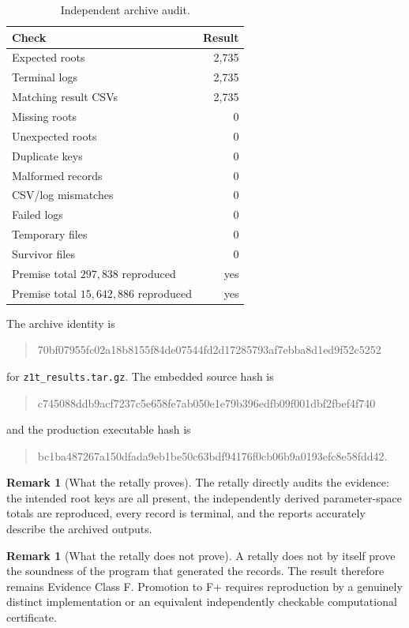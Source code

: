 \documentclass[11pt,a4paper]{article}
\theoremstyle{definition}\newtheorem{definition}[theorem]{Definition}\newtheorem{remark}[theorem]{Remark}
\newcommand{\code}[1]{\texttt{#1}}
\begin{document}
\begin{table}[ht]
\centering
\caption{Independent archive audit.}
\label{tab:audit}
\begin{tabular}{lr}
\toprule
Check & Result\\
\midrule
Expected roots & 2,735\\
Terminal logs & 2,735\\
Matching result CSVs & 2,735\\
Missing roots & 0\\
Unexpected roots & 0\\
Duplicate keys & 0\\
Malformed records & 0\\
CSV/log mismatches & 0\\
Failed logs & 0\\
Temporary files & 0\\
Survivor files & 0\\
Premise total $297{,}838$ reproduced & yes\\
Premise total $15{,}642{,}886$ reproduced & yes\\
\bottomrule
\end{tabular}
\end{table}

The archive identity is
\begin{quote}\small\ttfamily
70bf07955fc02a18b8155f84de07544fd2d17285793af7ebba8d1ed9f52c5252
\end{quote}
for \code{z1t\_results.tar.gz}.  The embedded source hash is
\begin{quote}\small\ttfamily
c745088ddb9acf7237c5e658fe7ab050e1e79b396edfb09f001dbf2fbef4f740
\end{quote}
and the production executable hash is
\begin{quote}\small\ttfamily
bc1ba487267a150dfada9eb1be50c63bdf94176f0cb06b9a0193efc8e58fdd42.
\end{quote}

\begin{remark}[What the retally proves]
The retally directly audits the evidence: the intended root keys are all present, the independently derived parameter-space totals are reproduced, every record is terminal, and the reports accurately describe the archived outputs.
\end{remark}

\begin{remark}[What the retally does not prove]
A retally does not by itself prove the soundness of the program that generated the records.  The result therefore remains Evidence Class F.  Promotion to F+ requires reproduction by a genuinely distinct implementation or an equivalent independently checkable computational certificate.
\end{remark}
\end{document}
